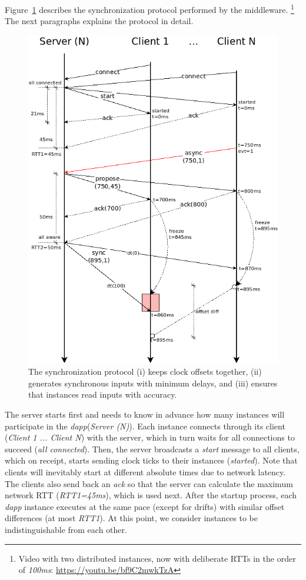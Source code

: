 \documentclass[sigplan,screen]{acmart}
\newcommand{\dapp}{\emph{dapp}\xspace}
\begin{document}
Figure~\ref{fig.protocol} describes the synchronization protocol performed by
the middleware.%
\footnote {
    Video with two distributed instances, now with deliberate RTTs in the order
    of \emph{100ms}: \url{https://youtu.be/bf9C2mwkTzA}
}
The next paragraphs explains the protocol in detail.

\begin{figure}[t]
  \centering
  \includegraphics[width=\linewidth]{protocol}
  \caption{
    \label{fig.protocol}
    The synchronization protocol
        (i) keeps clock offsets together,
        (ii) generates synchronous inputs with minimum delays, and
        (iii) ensures that instances read inputs with accuracy.
  }
\end{figure}

The server starts first and needs to know in advance how many instances will
participate in the \dapp (\emph{Server (N)}).
Each instance connects through its client (\emph{Client 1 ... Client N}) with
the server, which in turn waits for all connections to succeed
(\emph{all connected}).
Then, the server broadcasts a \emph{start} message to all clients, which on
receipt, starts sending clock ticks to their instances (\emph{started}).
Note that clients will inevitably start at different absolute times due to
network latency.
The clients also send back an \emph{ack} so that the server can calculate the
maximum network RTT (\emph{RTT1=45ms}), which is used next.
%
After the startup process, each \dapp instance executes at the same pace
(except for drifts) with similar offset differences (at most \emph{RTT1}).
At this point, we consider instances to be indistinguishable from each other.
\end{document}
